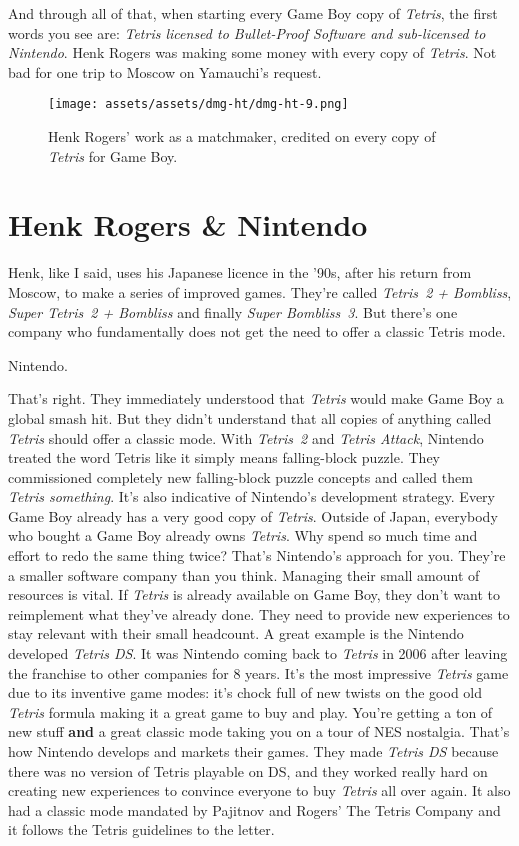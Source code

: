 \documentclass{book}
\begin{document}
And through all of that, when starting every Game Boy copy of \emph{Tetris}, the first words you see are: \emph{Tetris licensed to Bullet-Proof Software and sub-licensed to Nintendo}. Henk Rogers was making some money with every copy of \emph{Tetris}. Not bad for one trip to Moscow on Yamauchi’s request.

\begin{figure}[hbt]
\vskip 10pt
\centering \texttt{[image: assets/assets/dmg-ht/dmg-ht-9.png]}\par\pagetwodescription Henk Rogers’ work as a matchmaker, credited on every copy of \emph{Tetris} for Game Boy.
\vskip 6pt
\end{figure}

\FloatBarrier\needspace{10mm}\section*{Henk Rogers \& Nintendo}\nopagebreak[4]

Henk, like I said, uses his Japanese licence in the ’90s, after his return from Moscow, to make a series of improved games. They’re called \emph{Tetris~2 + Bombliss}, \emph{Super Tetris~2 + Bombliss} and finally \emph{Super Bombliss~3}. But there’s one company who fundamentally does not get the need to offer a classic Tetris mode.

Nintendo.

That’s right. They immediately understood that \emph{Tetris} would make Game Boy a global smash hit. But they didn’t understand that all copies of anything called \emph{Tetris} should offer a classic mode. With \emph{Tetris~2} and \emph{Tetris Attack}, Nintendo treated the word Tetris like it simply means falling-block puzzle. They commissioned completely new falling-block puzzle concepts and called them \emph{Tetris something}. It’s also indicative of Nintendo’s development strategy. Every Game Boy already has a very good copy of \emph{Tetris}. Outside of Japan, everybody who bought a Game Boy already owns \emph{Tetris}. Why spend so much time and effort to redo the same thing twice? That’s Nintendo’s approach for you. They’re a smaller software company than you think. Managing their small amount of resources is vital. If \emph{Tetris} is already available on Game Boy, they don’t want to reimplement what they’ve already done. They need to provide new experiences to stay relevant with their small headcount. A great example is the Nintendo developed \emph{Tetris DS}. It was Nintendo coming back to \emph{Tetris} in 2006 after leaving the franchise to other companies for 8 years. It’s the most impressive \emph{Tetris} game due to its inventive game modes: it’s chock full of new twists on the good old \emph{Tetris} formula making it a great game to buy and play. You’re getting a ton of new stuff \textbf{and} a great classic mode taking you on a tour of NES nostalgia. That’s how Nintendo develops and markets their games. They made \emph{Tetris DS} because there was no version of Tetris playable on DS, and they worked really hard on creating new experiences to convince everyone to buy \emph{Tetris} all over again. It also had a classic mode mandated by Pajitnov and Rogers’ The Tetris Company and it follows the Tetris guidelines to the letter.
\end{document}
